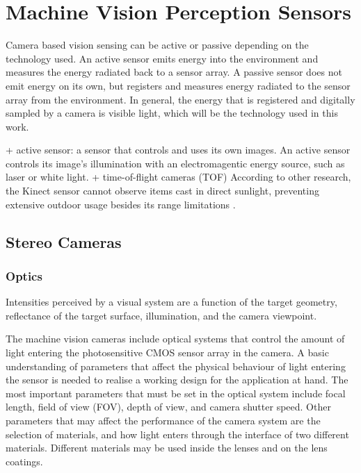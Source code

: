 \documentclass[12pt,a4paper,oneside,pdftex]{report}
\begin{document}
\section{Machine Vision Perception Sensors}
\label{section:perception_sensors}

Camera based vision sensing can be active or passive depending on the technology used. An active sensor emits energy into the environment and measures the energy radiated back to a sensor array. A passive sensor does not emit energy on its own, but registers and measures energy radiated to the sensor array from the environment. In general, the energy that is registered and digitally sampled by a camera is visible light, which will be the technology used in this work.



+ active sensor: a sensor that controls and uses its own images. An active sensor controls its image's illumination with an electromagentic energy source, such as laser or white light.
+ time-of-flight cameras (TOF)
According to other research, the Kinect sensor cannot observe items cast in direct sunlight, preventing extensive outdoor usage besides its range limitations \cite{tikkanen13}.  

\subsection{Stereo Cameras}
\label{subsection:stereo_cameras}

\subsubsection{Optics}
\label{subsubsection:optics_and_photometrics}


Intensities perceived by a visual system are a function of the target geometry, reflectance of the target surface, illumination, and the camera viewpoint.

The machine vision cameras include optical systems that control the amount of light entering the photosensitive CMOS sensor array in the camera. A basic understanding of parameters that affect the physical behaviour of light entering the sensor is needed to realise a working design for the application at hand. The most important parameters that must be set in the optical system include focal length, field of view (FOV), depth of view, and camera shutter speed. Other parameters that may affect the performance of the camera system are the selection of materials, and how light enters through the interface of two different materials. Different materials may be used inside the lenses and on the lens coatings. 
\end{document}
